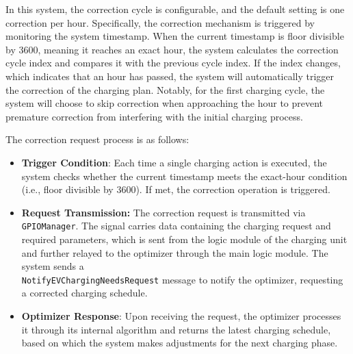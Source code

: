 \documentclass[
	english,
	ruledheaders=section,%
	class=report,%
	thesis={type=Report},%
	accentcolor=9c,%
	custommargins=true,%
	marginpar=false,%
	parskip=half-,%
	fontsize=11pt,%
	logofile={img/tuda_logo.pdf}, %
]{tudapub}
\begin{document}

In this system, the correction cycle is configurable, and the default setting is one correction per hour. Specifically, the correction mechanism is triggered by monitoring the system timestamp. When the current timestamp is floor divisible by 3600, meaning it reaches an exact hour, the system calculates the correction cycle index and compares it with the previous cycle index. If the index changes, which indicates that an hour has passed, the system will automatically trigger the correction of the charging plan. Notably, for the first charging cycle, the system will choose to skip correction when approaching the hour to prevent premature correction from interfering with the initial charging process.

The correction request process is as follows:
\begin{itemize}
    \item \textbf{Trigger Condition}: Each time a single charging action is executed, the system checks whether the current timestamp meets the exact-hour condition (i.e., floor divisible by 3600). If met, the correction operation is triggered.
    \item \textbf{Request Transmission:} The correction request is transmitted via \texttt{GPIOManager}. The signal carries data containing the charging request and required parameters, which is sent from the logic module of the charging unit and further relayed to the optimizer through the main logic module. The system sends a \\\texttt{NotifyEVChargingNeedsRequest} message to notify the optimizer, requesting a corrected charging schedule.
    \item \textbf{Optimizer Response}: Upon receiving the request, the optimizer processes it through its internal algorithm and returns the latest charging schedule, based on which the system makes adjustments for the next charging phase.
\end{itemize}
\end{document}

